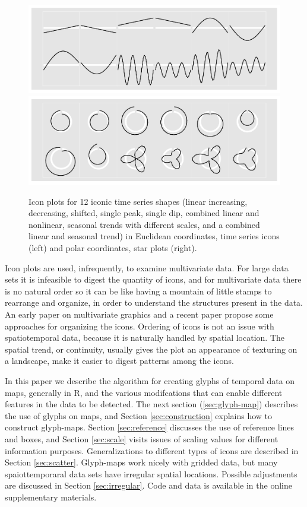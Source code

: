 \documentclass[oneside]{article}
\begin{document}
\begin{figure}[htbp]
  \centering
  \includegraphics[width=0.5\linewidth]{euclid-to-polar-1}%
  \includegraphics[width=0.5\linewidth]{euclid-to-polar-2}

  \caption{Icon plots for 12 iconic time series shapes (linear increasing, decreasing, shifted, single peak, single dip, combined linear and nonlinear, seasonal trends with different scales, and a combined linear and seasonal trend) in Euclidean coordinates, time series icons (left) and polar coordinates, star plots (right).}
  \label{fig:templates}
\end{figure}



Icon plots are used, infrequently, to examine multivariate data. For large data sets it is infeasible to digest the quantity of icons, and for multivariate data there is no natural order so it can be like having a mountain of little stamps to rearrange and organize, in order to understand the structures present in the data. An early paper on multivariate graphics \citep{kleiner:1981} and a recent paper \citep{hurley:2010} propose some approaches for organizing the icons. Ordering of icons is not an issue with spatiotemporal data, because it is naturally handled by spatial location. The spatial trend, or continuity, usually gives the plot an appearance of texturing on a landscape, make it easier to digest patterns among the icons.

In this paper we describe the algorithm for creating glyphs of temporal data on maps, generally in R, and the various modifcations that can enable different features in the data to be detected. The next section (\ref{sec:glyph-map}) describes the use of glyphs on maps, and Section \ref{sec:construction} explains how to construct glyph-maps. Section \ref{sec:reference} discusses the use of reference lines and boxes, and Section \ref{sec:scale} visits issues of scaling values for different information purposes. Generalizations to different types of icons are described in Section \ref{sec:scatter}. Glyph-maps work nicely with gridded data, but many spaiottemporaral data sets have irregular spatial locations. Possible adjustments are discussed in Section \ref{sec:irregular}. Code and data is available in the online supplementary materials.
\end{document}
